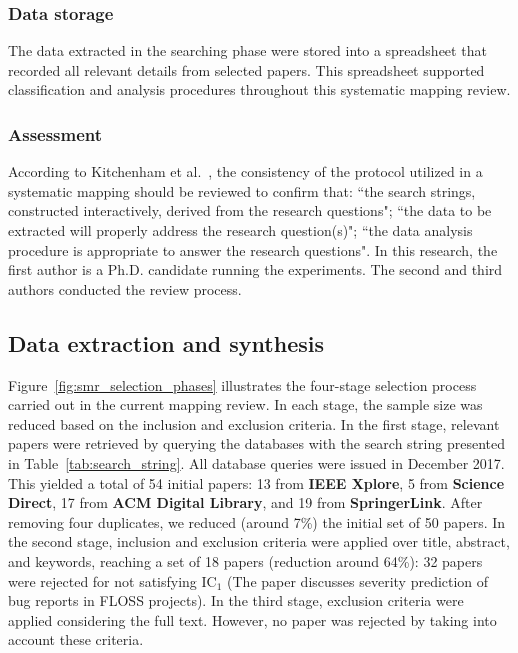 \subsubsection{Data storage}\label{subsubsec:storage}
The data extracted in the searching phase were stored into a spreadsheet that recorded all relevant details from selected papers. This spreadsheet supported classification and analysis procedures throughout this systematic mapping review.

\subsubsection{Assessment}\label{subsubsec:assessment}
According to Kitchenham et al.~\cite{Kitchenham:2007}, the consistency of the protocol utilized in a systematic mapping  should be reviewed to confirm that: ``the search strings, constructed interactively, derived from the research questions";  ``the data to be extracted will properly address the research question(s)"; ``the data analysis procedure is appropriate to answer the research questions". In this research, the first author is a Ph.D. candidate running the experiments. The second and third authors conducted the review process.

\subsection{Data extraction and synthesis}\label{subsec:extraction}

Figure~\ref{fig:smr_selection_phases} illustrates the four-stage selection process carried out in the current mapping review. In each stage, the sample size was reduced based on the inclusion and exclusion criteria. In the first stage, relevant papers were retrieved by querying the databases with the search string presented in Table~\ref{tab:search_string}. All database queries were issued in December 2017. This yielded a total of 54 initial papers: 13 from \textbf{IEEE Xplore}, 5 from \textbf{Science Direct}, 17 from \textbf{ACM Digital Library}, and 19 from \textbf{SpringerLink}. After removing four duplicates, we reduced (around 7\%) the initial set of 50 papers. 
In the second stage, inclusion and exclusion criteria were applied over title, abstract, and keywords, reaching a set of 18 papers (reduction around 64\%): 32 papers were rejected for not satisfying IC$_{1}$ (The paper discusses severity prediction of bug reports in FLOSS projects). In the third stage, exclusion criteria were applied considering the full text. However, no paper was rejected by taking into account these criteria. 

